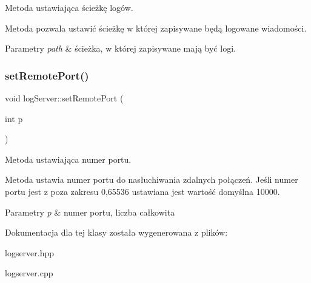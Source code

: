 Metoda ustawiająca ścieżkę logów. 

Metoda pozwala ustawić ścieżkę w której zapisywane będą logowane wiadomości.


\begin{DoxyParams}{Parametry}
{\em path} & ścieżka, w której zapisywane mają być logi. \\
\hline
\end{DoxyParams}
\mbox{\label{classlog_server_acc990124cb133cbcad5f9ce8bce04bac}} 
\subsubsection{\texorpdfstring{set\+Remote\+Port()}{setRemotePort()}}
{\footnotesize\ttfamily void log\+Server\+::set\+Remote\+Port (\begin{DoxyParamCaption}\item[{int}]{p }\end{DoxyParamCaption})}



Metoda ustawiająca numer portu. 

Metoda ustawia numer portu do nasłuchiwania zdalnych połączeń. Jeśli numer portu jest z poza zakresu 0,65536 ustawiana jest wartość domyślna 10000.


\begin{DoxyParams}{Parametry}
{\em p} & numer portu, liczba całkowita \\
\hline
\end{DoxyParams}


Dokumentacja dla tej klasy została wygenerowana z plików\+:\begin{DoxyCompactItemize}
\item 
logserver.\+hpp\item 
logserver.\+cpp\end{DoxyCompactItemize}
